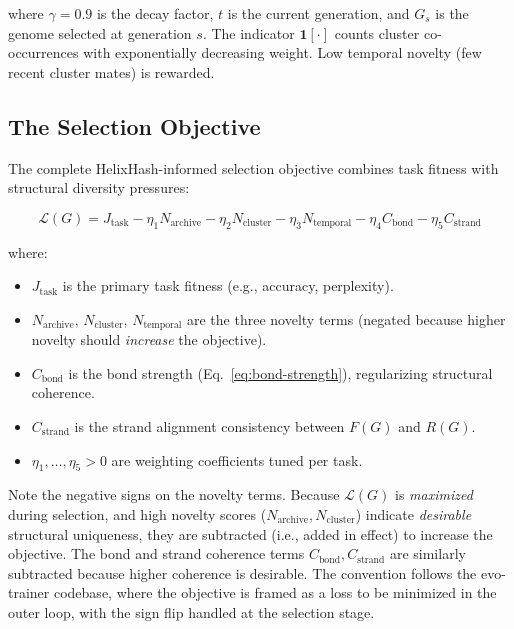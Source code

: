 where $\gamma = 0.9$ is the decay factor, $t$ is the current generation, and $G_s$ is the genome selected at generation $s$. The indicator $\mathbf{1}[\cdot]$ counts cluster co-occurrences with exponentially decreasing weight. Low temporal novelty (few recent cluster mates) is rewarded.

\subsection{The Selection Objective}

The complete HelixHash-informed selection objective combines task fitness with structural diversity pressures:

\begin{equation}
\boxed{
\mathcal{L}(G) = J_{\text{task}} - \eta_1 N_{\text{archive}} - \eta_2 N_{\text{cluster}} - \eta_3 N_{\text{temporal}} - \eta_4 C_{\text{bond}} - \eta_5 C_{\text{strand}}
}
\label{eq:selection-objective}
\end{equation}

where:
\begin{itemize}[leftmargin=1.5em]
  \item $J_{\text{task}}$ is the primary task fitness (e.g., accuracy, perplexity).
  \item $N_{\text{archive}}$, $N_{\text{cluster}}$, $N_{\text{temporal}}$ are the three novelty terms (negated because higher novelty should \emph{increase} the objective).
  \item $C_{\text{bond}}$ is the bond strength (Eq.~\ref{eq:bond-strength}), regularizing structural coherence.
  \item $C_{\text{strand}}$ is the strand alignment consistency between $F(G)$ and $R(G)$.
  \item $\eta_1, \ldots, \eta_5 > 0$ are weighting coefficients tuned per task.
\end{itemize}

\begin{implnote}
Note the negative signs on the novelty terms. Because $\mathcal{L}(G)$ is \emph{maximized} during selection, and high novelty scores ($N_{\text{archive}}, N_{\text{cluster}}$) indicate \emph{desirable} structural uniqueness, they are subtracted (i.e., added in effect) to increase the objective. The bond and strand coherence terms $C_{\text{bond}}, C_{\text{strand}}$ are similarly subtracted because higher coherence is desirable. The convention follows the evo-trainer codebase, where the objective is framed as a loss to be minimized in the outer loop, with the sign flip handled at the selection stage.
\end{implnote}

